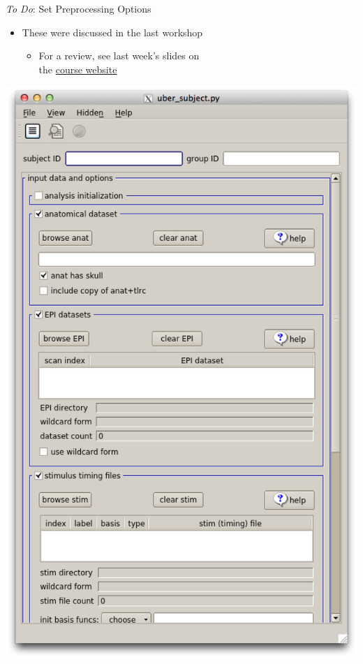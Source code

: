 \documentclass[t,12pt]{beamer}
\begin{document}
\begin{frame}{\emph{To Do}: Set Preprocessing Options}
\vspace{10pt}
\begin{itemize}
\setlength\itemsep{1em}
\item These were discussed in the last workshop
\vspace{4pt}
\begin{itemize}
\item For a review, see last week's slides on \\ the \href{https://emdupre.github.io/hd4630_workshops/categories}{course website}
\end{itemize}
\end{itemize}
\vspace{6pt}
\centering
\includegraphics[width=.65\textwidth]{images/uber_subject.png}
\end{frame}
\end{document}

